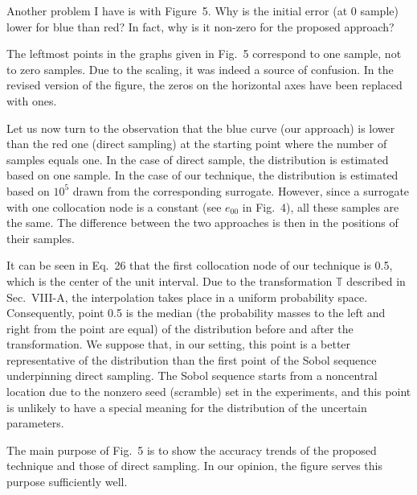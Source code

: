 \begin{reviewer}
Another problem I have is with Figure~5. Why is the initial error (at 0 sample)
lower for blue than red? In fact, why is it non-zero for the proposed approach?
\end{reviewer}

\begin{authors}
The leftmost points in the graphs given in Fig.~5 correspond to one sample, not
to zero samples. Due to the scaling, it was indeed a source of confusion. In the
revised version of the figure, the zeros on the horizontal axes have been
replaced with ones.

Let us now turn to the observation that the blue curve (our approach) is lower
than the red one (direct sampling) at the starting point where the number of
samples equals one. In the case of direct sample, the distribution is estimated
based on one sample. In the case of our technique, the distribution is estimated
based on $10^5$ drawn from the corresponding surrogate. However, since a
surrogate with one collocation node is a constant (see $e_{00}$ in Fig.~4), all
these samples are the same. The difference between the two approaches is then in
the positions of their samples.

It can be seen in Eq.~26 that the first collocation node of our technique is
0.5, which is the center of the unit interval. Due to the transformation
$\mathbb{T}$ described in Sec.~VIII-A, the interpolation takes place in a
uniform probability space. Consequently, point 0.5 is the median (the
probability masses to the left and right from the point are equal) of the
distribution before and after the transformation. We suppose that, in our
setting, this point is a better representative of the distribution than the
first point of the Sobol sequence underpinning direct sampling. The Sobol
sequence starts from a noncentral location due to the nonzero seed (scramble)
set in the experiments, and this point is unlikely to have a special meaning for
the distribution of the uncertain parameters.

The main purpose of Fig.~5 is to show the accuracy trends of the proposed
technique and those of direct sampling. In our opinion, the figure serves this
purpose sufficiently well.

\begin{actions}
\end{actions}
\end{authors}
